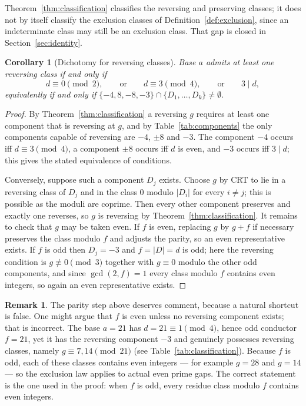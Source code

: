\documentclass[11pt,reqno]{amsart}
\theoremstyle{plain}
\newtheorem{corollary}[theorem]{Corollary}
\theoremstyle{definition}
\newtheorem{remark}[theorem]{Remark}
\begin{document}
Theorem~\ref{thm:classification} classifies the reversing and preserving
classes; it does not by itself classify the exclusion classes of
Definition~\ref{def:exclusion}, since an indeterminate class may still be an
exclusion class. That gap is closed in Section~\ref{sec:identity}.

\begin{corollary}[Dichotomy for reversing classes]
\label{cor:dichotomy}
Base $a$ admits at least one \emph{reversing} class if and only if
\[
  d \equiv 0 \!\!\pmod 2, \qquad\text{or}\qquad d \equiv 3 \!\!\pmod 4,
  \qquad\text{or}\qquad 3 \mid d,
\]
equivalently if and only if $\{-4, 8, -8, -3\} \cap \{D_1, \dots, D_k\} \neq
\emptyset$.
\end{corollary}

\begin{proof}
By Theorem~\ref{thm:classification} a reversing $g$ requires at least one
component that is reversing at $g$, and by Table~\ref{tab:components} the only
components capable of reversing are $-4$, $\pm 8$ and $-3$. The component $-4$
occurs iff $d \equiv 3 \pmod 4$, a component $\pm 8$ occurs iff $d$ is even,
and $-3$ occurs iff $3 \mid d$; this gives the stated equivalence of
conditions.

Conversely, suppose such a component $D_j$ exists. Choose $g$ by CRT to lie in
a reversing class of $D_j$ and in the class $0$ modulo $|D_i|$ for every
$i \neq j$; this is possible as the moduli are coprime. Then every other
component preserves and exactly one reverses, so $g$ is reversing by
Theorem~\ref{thm:classification}. It remains to check that $g$ may be taken
even. If $f$ is even, replacing $g$ by $g + f$ if necessary preserves the class
modulo $f$ and adjusts the parity, so an even representative exists. If $f$ is
odd then $D_j = -3$ and $f = |D| = d$ is odd; here the reversing condition is
$g \not\equiv 0 \pmod 3$ together with $g \equiv 0$ modulo the other odd
components, and since $\gcd(2, f) = 1$ every class modulo $f$ contains even
integers, so again an even representative exists.
\end{proof}

\begin{remark}
\label{rem:parity}
The parity step above deserves comment, because a natural shortcut is false.
One might argue that $f$ is even unless no reversing component exists; that is
incorrect. The base $a = 21$ has $d = 21 \equiv 1 \pmod 4$, hence odd conductor
$f = 21$, yet it has the reversing component $-3$ and genuinely possesses
reversing classes, namely $g \equiv 7, 14 \pmod{21}$ (see
Table~\ref{tab:classification}). Because $f$ is odd, each of these classes
contains even integers --- for example $g = 28$ and $g = 14$ --- so the
exclusion law applies to actual even prime gaps. The correct statement is the
one used in the proof: when $f$ is odd, every residue class modulo $f$ contains
even integers.
\end{remark}
\end{document}
